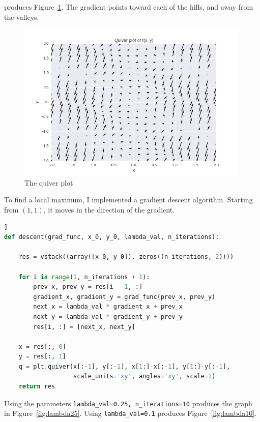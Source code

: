 \documentclass[]{article}
\begin{document}
produces Figure~\ref{fig:quiver}. The gradient points toward each of the hills, and away from the valleys.

\begin{figure}
\centering
\includegraphics[height=3in]{../img/quiver.png}
\caption{The quiver plot}
\label{fig:quiver}
\end{figure}

To find a local maximum, I implemented a gradient descent algorithm. Starting from $(1, 1)$, it moves in the direction of the gradient.

\begin{lstlisting}[language=Python, frame=single]]
def descent(grad_func, x_0, y_0, lambda_val, n_iterations):

    res = vstack((array([x_0, y_0]), zeros((n_iterations, 2))))

    for i in range(1, n_iterations + 1):
        prev_x, prev_y = res[i - 1, :]
        gradient_x, gradient_y = grad_func(prev_x, prev_y)
        next_x = lambda_val * gradient_x + prev_x
        next_y = lambda_val * gradient_y + prev_y
        res[i, :] = [next_x, next_y]

    x = res[:, 0]
    y = res[:, 1]
    q = plt.quiver(x[:-1], y[:-1], x[1:]-x[:-1], y[1:]-y[:-1],
                   scale_units='xy', angles='xy', scale=1)
    return res
\end{lstlisting}

Using the parameters \texttt{lambda\_val=0.25, n\_iterations=10} produces the graph in Figure~\ref{fig:lambda25}. Using \texttt{lambda\_val=0.1} produces Figure~\ref{fig:lambda10}.
\end{document}
